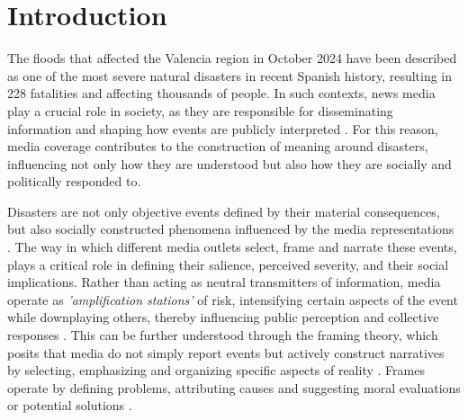 
\section{Introduction}
The floods that affected the Valencia region in October 2024 have been described as one of the most severe natural disasters in recent Spanish
history, resulting in 228 fatalities and affecting thousands of people. In such contexts, news media play a crucial
role in society, as they are responsible for disseminating information and shaping how events are publicly interpreted \parencite{DisastersandtheMedia,cottle}.
For this reason, media coverage contributes to the construction of meaning around disasters, influencing not only how they are understood but 
also how they are socially and politically responded to.

Disasters are not only objective events defined by their material consequences, but also socially constructed phenomena influenced
by the media representations \parencite{DisastersandtheMedia}. The way in which different media outlets select, frame and narrate these events, plays a critical role in defining their
salience, perceived severity, and their social implications. Rather than acting as neutral transmitters of information, media operate as 
\emph{'amplification stations'} of risk, intensifying certain aspects of the event while downplaying others, thereby influencing public perception and
collective responses \parencite{amplification_risk}. This can be further understood through the framing theory, which posits that media do not simply report events but actively 
construct narratives by selecting, emphasizing and organizing specific aspects of reality \parencite{framing_media}. Frames operate by defining problems, attributing
causes and suggesting moral evaluations or potential solutions \parencite{Entman1993}.

